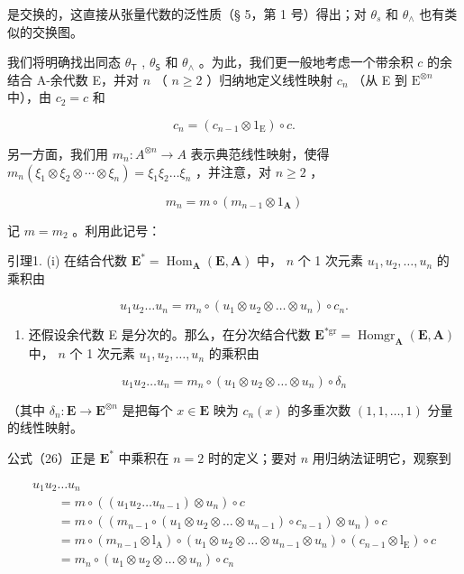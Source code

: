 是交换的，这直接从张量代数的泛性质（§ 5，第 1 号）得出；对 \(\theta_{s}\) 和 \(\theta_{\wedge}\) 也有类似的交换图。

我们将明确找出同态 \(\theta_{\mathsf{T}}\) , \(\theta_{\mathsf{S}}\) 和 \(\theta_{\wedge}\) 。为此，我们更一般地考虑一个带余积 \(c\) 的余结合 A-余代数 E，并对 \(n\) （ \(n \geqslant 2\) ）归纳地定义线性映射 \(c_{n}\) （从 E 到 \(\mathrm{E}^{\otimes n}\) 中），由 \(c_{2} = c\) 和

\[
c _ {n} = \left(c _ {n - 1} \otimes 1 _ {\mathrm{E}}\right) \circ c.\tag{24}
\]

另一方面，我们用 \(m_{n}:A^{\otimes n}\to A\) 表示典范线性映射，使得 \(m_{n}(\xi_{1}\otimes\xi_{2}\otimes\cdots\otimes\xi_{n})=\xi_{1}\xi_{2}\ldots\xi_{n}\) ，并注意，对 \(n\geqslant2\) ，

\[
m _ {n} = m \circ (m _ {n - 1} \otimes 1 _ {\mathbf {A}})\tag{25}
\]

记 \(m = m_2\) 。利用此记号：

引理1. (i) 在结合代数 \(\mathbf{E}^* = \operatorname{Hom}_{\mathbf{A}}(\mathbf{E}, \mathbf{A})\) 中， \(n\) 个 1 次元素 \(u_1, u_2, \ldots, u_n\) 的乘积由

\[
u _ {1} u _ {2} \dots u _ {n} = m _ {n} \circ (u _ {1} \otimes u _ {2} \otimes \dots \otimes u _ {n}) \circ c _ {n}.\tag{26}
\]

\begin{enumerate}
\def\labelenumi{(\roman{enumi})}
\setcounter{enumi}{1}
\tightlist
\item
  还假设余代数 E 是分次的。那么，在分次结合代数 \(\mathbf{E}^{*\mathrm{gr}} = \operatorname{Homgr}_{\mathbf{A}}(\mathbf{E}, \mathbf{A})\) 中， \(n\) 个 1 次元素 \(u_1, u_2, \ldots, u_n\) 的乘积由
\end{enumerate}

\[
u _ {1} u _ {2} \dots u _ {n} = m _ {n} \circ (u _ {1} \otimes u _ {2} \otimes \dots \otimes u _ {n}) \circ \delta_ {n}\tag{27}
\]

（其中 \(\delta_n: \mathbf{E} \to \mathbf{E}^{\otimes n}\) 是把每个 \(x \in \mathbf{E}\) 映为 \(c_n(x)\) 的多重次数 \((1, 1, \ldots, 1)\) 分量的线性映射。

公式（26）正是 \(\mathbf{E}^*\) 中乘积在 \(n = 2\) 时的定义；要对 \(n\) 用归纳法证明它，观察到

\[
\begin{array}{l} u _ {1} u _ {2} \dots u _ {n} \\ \qquad = m \circ ((u _ {1} u _ {2} \dots u _ {n - 1}) \otimes u _ {n}) \circ c \\ \qquad = m \circ ((m _ {n - 1} \circ (u _ {1} \otimes u _ {2} \otimes \dots \otimes u _ {n - 1}) \circ c _ {n - 1}) \otimes u _ {n}) \circ c \\ \qquad = m \circ (m _ {n - 1} \otimes \mathrm{l} _ {\mathrm{A}}) \circ (u _ {1} \otimes u _ {2} \otimes \dots \otimes u _ {n - 1} \otimes u _ {n}) \circ (c _ {n - 1} \otimes \mathrm{l} _ {\mathrm{E}}) \circ c \\ \qquad = m _ {n} \circ (u _ {1} \otimes u _ {2} \otimes \dots \otimes u _ {n}) \circ c _ {n} \end{array}
\]

